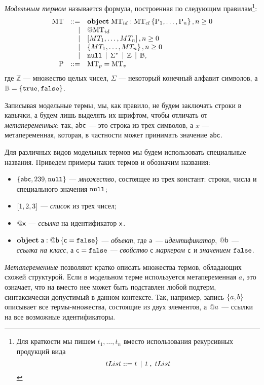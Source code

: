 \begin{Def}
\emph{Модельным термом} называется формула, построенная по следующим правилам\footnote{
Для краткости мы пишем $t_1, \ldots, t_n$ вместо использования рекурсивных продукций вида $$tList ::= t \;\,|\;\, t \;,\; tList$$
}:
\[
\begin{array}{rrl}
	\mbox{MT} & ::= & \mathbf{object}\;\mbox{MT}_{id} : \mbox{MT}_{cl}\left\{ \mbox{P}_1,\ldots,\mbox{P}_n \right\}, n \ge 0 \\ 
	           &   | & @\mbox{MT}_{id} \\ 
	           &   | & \left[MT_1,\ldots,MT_n\right], n \ge 0 \\ 
	           &   | & \left\{MT_1,\ldots,MT_n\right\}, n \ge 0 \\ 
	           &   | & \mathtt{null} \;\,|\;\, \Sigma^* \;\,|\;\, \mathbb{Z} \;\,|\;\, \mathbb{B}, \\
	\mbox{P} & ::= & \mbox{MT}_{p}=\mbox{MT}_{v}\\
\end{array}
\]
где $\mathbb{Z}$ --- множество целых чисел, $\Sigma$ --- некоторый конечный алфавит символов, а $\mathbb{B} = \left\{ \mathtt{true}, \mathtt{false} \right\}$.
\end{Def}

Записывая модельные термы, мы, как правило, не будем заключать строки в кавычки, а будем лишь выделять их шрифтом, чтобы отличать от \emph{метапеременных}: так, $\mathsf{abc}$ --- это строка из трех символов, а $x$ --- метапеременная, которая, в частности может принимать значение $\mathsf{abc}$.

Для различных видов модельных термов мы будем использовать специальные названия. Приведем примеры таких термов и обозначим названия:
\begin{itemize}
\item $\left\{\mathsf{abc}, 239, \mathtt{null}\right\}$ --- \emph{множество}, состоящее из трех констант: строки, числа и специального значения $\mathtt{null}$;
\item $\left[1, 2, 3\right]$ --- \emph{список} из трех чисел;
\item $@\mathsf{x}$ --- \emph{ссылка} на идентификатор $\mathsf{x}$.
\item $\mathbf{object}\;\mathsf{a} : @\mathsf{b}\left\{ \mathsf{c}=\mathtt{false} \right\}$ --- \emph{объект}, где $\mathsf{a}$ --- \emph{идентификатор}, $@\mathsf{b}$ --- \emph{ссылка на класс}, а $\mathsf{c} = \mathtt{false}$ --- \emph{свойство} с \emph{маркером} $\mathsf{c}$ и  \emph{значением} $\mathtt{false}$.
\end{itemize}

\emph{Метапеременные} позволяют кратко описать множества термов, обладающих схожей структурой. Если в модельном терме используется метапеременная $a$, это означает, что на вместо нее может быть подставлен любой подтерм, синтаксически допустимый в данном контексте. Так, например, запись $\left\{a, b\right\}$ описывает все термы-множества, состоящие из двух элементов, а $@a$ --- ссылки на все возможные идентификаторы.

